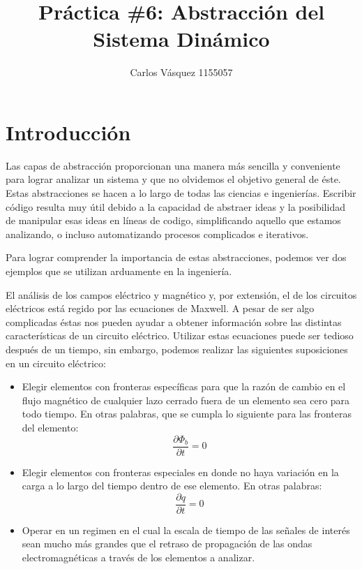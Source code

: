 \documentclass[12pt, letterpaper]{article}
\title{Práctica \#6: Abstracción del Sistema Dinámico}
\author{Carlos Vásquez 1155057}
\begin{document}
\maketitle
\section*{Introducción}

Las capas de abstracción proporcionan una manera más sencilla y conveniente para lograr analizar un sistema y que no olvidemos el objetivo general de éste. Estas abstracciones se hacen a lo largo de todas las ciencias e ingenierías. Escribir código resulta muy útil debido a la capacidad de abstraer ideas y la posibilidad de manipular esas ideas en líneas de codigo, simplificando aquello que estamos analizando, o incluso automatizando procesos complicados e iterativos.

Para lograr comprender la importancia de estas abstracciones, podemos ver dos ejemplos que se utilizan arduamente en la ingeniería.

El análisis de los campos eléctrico y magnético y, por extensión, el de los circuitos eléctricos está regido por las ecuaciones de Maxwell. A pesar de ser algo complicadas éstas nos pueden ayudar a obtener información sobre las distintas características de un circuito eléctrico. Utilizar estas ecuaciones puede ser tedioso después de un tiempo, sin embargo, podemos realizar las siguientes suposiciones en un circuito eléctrico:\autocite{agarwal05}

\begin{itemize}
	\item Elegir elementos con fronteras específicas para que la razón de cambio en el flujo magnético de cualquier lazo cerrado fuera de un elemento sea cero para todo tiempo. En otras palabras, que se cumpla lo siguiente para las fronteras del elemento:
		\begin{equation}
			\frac{\partial \Phi_b}{\partial t} = 0
		\end{equation}
	\item Elegir elementos con fronteras especiales en donde no haya variación en la carga a lo largo del tiempo dentro de ese elemento. En otras palabras:
		\begin{equation}
			\frac{\partial q}{\partial t} = 0
		\end{equation}
	\item Operar en un regimen en el cual la escala de tiempo de las señales de interés sean mucho más grandes que el retraso de propagación de las ondas electromagnéticas a través de los elementos a analizar.
\end{itemize}
\end{document}
